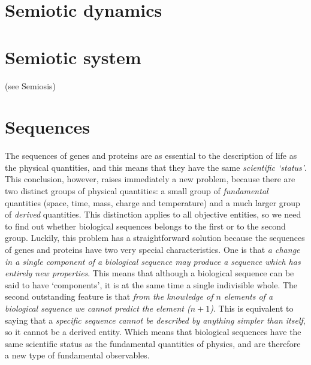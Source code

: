 \documentclass[12pt]{article}
\begin{document}
\hypertarget{Semiotic dynamics}{}
\section{Semiotic dynamics}

\section{Semiotic system} (see Semiosis)


\section{Sequences}
The sequences of genes and proteins are as essential to the description of life as the physical quantities, and this means that they have the same \textit{scientific `status'}. This conclusion, however, raises immediately a new problem, because there are two distinct groups of physical quantities: a small group of \textit{fundamental} quantities (space, time, mass, charge and temperature) and a much larger group of \textit{derived} quantities. This distinction applies to all objective entities, so we need to find out whether biological sequences belongs to the first or to the second group. Luckily, this problem has a straightforward solution because the sequences of genes and proteins have two very special characteristics. One is that \textit{a change in a single component of a biological sequence may produce a sequence which has entirely new properties}. This means that although a biological sequence can be said to have `components', it is at the same time a single indivisible whole. The second outstanding feature is that \textit{from the knowledge of $n$ elements of a biological sequence we cannot predict the element ($n+1$)}. This is equivalent to saying that a \textit{specific sequence cannot be described by anything simpler than itself}, so it cannot be a derived entity. Which means that biological sequences have the same scientific status as the fundamental quantities of physics, and are therefore a new type of fundamental observables. 


\hypertarget{signs}{}
\end{document}
